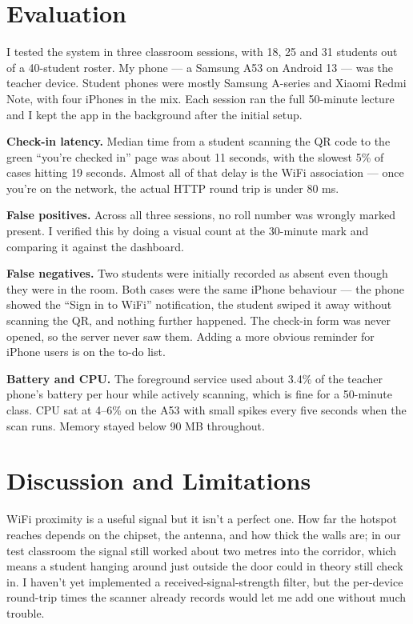 \documentclass[sigconf,10pt]{acmart}
\begin{document}
\section{Evaluation}

I tested the system in three classroom sessions, with 18, 25 and
31 students out of a 40-student roster. My phone --- a Samsung
A53 on Android 13 --- was the teacher device. Student phones were
mostly Samsung A-series and Xiaomi Redmi Note, with four iPhones
in the mix. Each session ran the full 50-minute lecture and I
kept the app in the background after the initial setup.

\textbf{Check-in latency.} Median time from a student scanning
the QR code to the green ``you're checked in'' page was about 11
seconds, with the slowest 5\% of cases hitting 19 seconds. Almost
all of that delay is the WiFi association --- once you're on the
network, the actual HTTP round trip is under 80 ms.

\textbf{False positives.} Across all three sessions, no roll
number was wrongly marked present. I verified this by doing a
visual count at the 30-minute mark and comparing it against the
dashboard.

\textbf{False negatives.} Two students were initially recorded
as absent even though they were in the room. Both cases were
the same iPhone behaviour --- the phone showed the ``Sign in to
WiFi'' notification, the student swiped it away without scanning
the QR, and nothing further happened. The check-in form was
never opened, so the server never saw them. Adding a more
obvious reminder for iPhone users is on the to-do list.

\textbf{Battery and CPU.} The foreground service used about
3.4\% of the teacher phone's battery per hour while actively
scanning, which is fine for a 50-minute class. CPU sat at 4--6\%
on the A53 with small spikes every five seconds when the scan
runs. Memory stayed below 90 MB throughout.

\section{Discussion and Limitations}

WiFi proximity is a useful signal but it isn't a perfect one. How
far the hotspot reaches depends on the chipset, the antenna, and
how thick the walls are; in our test classroom the signal still
worked about two metres into the corridor, which means a student
hanging around just outside the door could in theory still check
in. I haven't yet implemented a received-signal-strength filter,
but the per-device round-trip times the scanner already records
would let me add one without much trouble.
\end{document}
